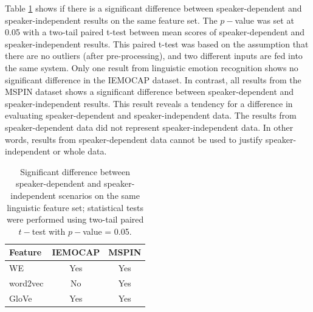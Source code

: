 Table \ref{tab:test_sd_loso} shows if there is a significant difference between
speaker-dependent and speaker-independent results on the same feature set. The
$p-$value was set at 0.05 with a two-tail paired t-test between mean scores of
speaker-dependent and speaker-independent results. This paired t-test was based
on the assumption that there are no outliers (after pre-processing), and two
different inputs are fed into the same system. Only one result from linguistic
emotion recognition shows no significant difference in the IEMOCAP dataset. In
contrast, all results from the MSPIN dataset shows a significant difference
between speaker-dependent and speaker-independent results. This result reveals
a tendency for a difference in evaluating speaker-dependent and
speaker-independent data. The results from speaker-dependent data did not
represent speaker-independent data. In other words, results from
speaker-dependent data cannot be used to justify speaker-independent or whole
data.

\begin{table}
    \caption{Significant difference between speaker-dependent and speaker-independent scenarios on the same linguistic feature set; statistical tests were performed using two-tail paired $t-$test with $p-$value = 0.05.}
    \begin{center}
    \label{tab:test_sd_loso}
    \begin{tabular}{l c c}
        \hline
Feature     &   IEMOCAP     & MSPIN \\
\hline \hline
WE          &   Yes         & Yes   \\
word2vec    &   No          & Yes   \\
GloVe       &   Yes         & Yes   \\
    \hline
    \end{tabular}
    \end{center}
\end{table}

